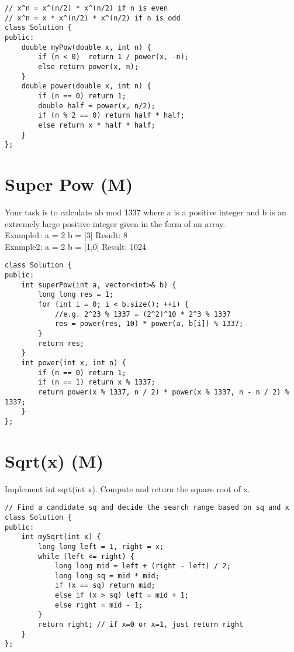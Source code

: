 \begin{lstlisting}
// x^n = x^(n/2) * x^(n/2) if n is even
// x^n = x * x^(n/2) * x^(n/2) if n is odd
class Solution {
public:
    double myPow(double x, int n) {
        if (n < 0)  return 1 / power(x, -n);
        else return power(x, n);
    }
    double power(double x, int n) {
        if (n == 0) return 1;
        double half = power(x, n/2);
        if (n % 2 == 0) return half * half;
        else return x * half * half;
    }
};
\end{lstlisting}


\section{Super Pow (M)}
Your task is to calculate ab mod 1337 where a is a positive integer and b is an extremely large positive integer given in the form of an array. \\
 
Example1:
a = 2
b = [3]
Result: 8\\

Example2:
a = 2
b = [1,0]
Result: 1024\\

\begin{lstlisting}
class Solution {
public:
    int superPow(int a, vector<int>& b) {
        long long res = 1;
        for (int i = 0; i < b.size(); ++i) {
            //e.g. 2^23 % 1337 = (2^2)^10 * 2^3 % 1337
            res = power(res, 10) * power(a, b[i]) % 1337;
        }
        return res;
    }
    int power(int x, int n) {
        if (n == 0) return 1;
        if (n == 1) return x % 1337;
        return power(x % 1337, n / 2) * power(x % 1337, n - n / 2) % 1337;
    }
};
\end{lstlisting}


\section{Sqrt(x) (M)}
Implement int sqrt(int x). Compute and return the square root of x. \\

\begin{lstlisting}
// Find a candidate sq and decide the search range based on sq and x
class Solution {
public:
    int mySqrt(int x) {
        long long left = 1, right = x;
        while (left <= right) {
            long long mid = left + (right - left) / 2;
            long long sq = mid * mid; 
            if (x == sq) return mid;
            else if (x > sq) left = mid + 1;
            else right = mid - 1;
        }
        return right; // if x=0 or x=1, just return right
    }
};
\end{lstlisting}


